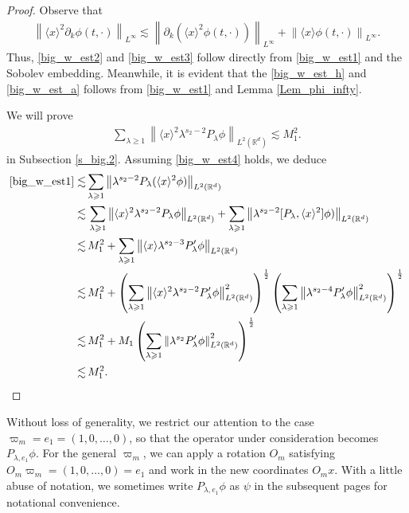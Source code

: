\documentclass[10pt,twoside,a4paper]{article}
\numberwithin{equation}{section}\allowdisplaybreaks
\def\geq{\geqslant}
\begin{document}
\begin{proof} Observe that
	\begin{align*}
		\left\|  \langle x\rangle^2 \partial_k\phi (t,\cdot) \right\|_{L^\infty} \lesssim  	\left\|\partial_k(  \langle x\rangle^2 \phi (t,\cdot) )\right\|_{L^\infty} +	\left\|  \langle x\rangle \phi (t,\cdot) \right\|_{L^\infty}.
	\end{align*}
	Thus, \eqref{big_w_est2} and \eqref{big_w_est3} follow directly from \eqref{big_w_est1} and the Sobolev embedding.  Meanwhile, it is evident that the \eqref{big_w_est_h} and \eqref{big_w_est_a} follows from \eqref{big_w_est1} and Lemma \ref{Lem_phi_infty}.

	
		We will prove
	\begin{align}
		\sum_{\lambda \geq 1} \left\| \langle x\rangle^{2} \lambda^{s_2 - 2} P_\lambda \phi \right\|_{L^{2}(\mathbb{R}^d)} 
		\lesssim M_1^2. \label{big_w_est4}
	\end{align}
	 in Subsection \ref{s_big.2}. Assuming \eqref{big_w_est4} holds, we deduce
	\begin{align*}
		\eqref{big_w_est1} \lesssim & \sum_{\lambda\geq 1} \left\| \lambda^{s_2-2}P_\lambda (\langle x\rangle^{2}\phi)\right\|_{L^{2}(\mathbb{R}^d)}\\
		\lesssim&\, \sum_{\lambda\geq 1} \left\| \langle x\rangle^{2}  \lambda^{s_2-2}P_\lambda\phi\right\|_{L^{2}(\mathbb{R}^d)}+ \sum_{\lambda\geq 1} \left\| \lambda^{s_2-2}[P_\lambda,\langle x\rangle^{2}]\phi)\right\|_{L^{2}(\mathbb{R}^d)}\\
		\lesssim &\,M_1^2 +\sum_{\lambda\geq 1} \left\|\langle x\rangle \lambda^{s_2-3}P_\lambda^\prime \phi\right\|_{L^{2}(\mathbb{R}^d)}\\
		\lesssim&\,M_1^2+\left(\sum_{\lambda\geq 1} \left\|\langle x\rangle^2 \lambda^{s_2-2}P_\lambda^\prime \phi\right\|_{L^{2}(\mathbb{R}^d)}^2\right)^{\frac 12} \left(\sum_{\lambda\geq 1} \left\|  \lambda^{s_2-4}P_\lambda^\prime \phi\right\|_{L^{2}(\mathbb{R}^d)}^2\right)^{\frac 12}\\
		\lesssim & \,M_1^2+M_1 \left(\sum_{\lambda\geq 1} \left\|  \lambda^{s_2}P_\lambda^\prime \phi\right\|_{L^{2}(\mathbb{R}^d)}^2\right)^{\frac 12}\\
		\lesssim &\,M_1^2.
	\end{align*}	
\end{proof}





Without loss of generality, we restrict our attention to the case \( \varpi_m = e_1=(1, 0, \dots, 0) \), so that the operator under consideration becomes \( P_{\lambda, e_1} \phi \). For the general $ \varpi_m $, we can apply a rotation \(O_m\) satisfying \(O_m \varpi_m = (1, 0, \dots, 0)=e_1\) and work in the new coordinates $ O_m x$. With a little abuse of notation, we sometimes write  $  P_{\lambda, e_1}  \phi$ as $ \psi $  in the subsequent pages for notational convenience.
\end{document}
